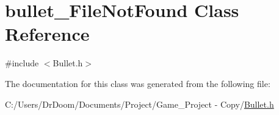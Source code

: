 \hypertarget{classbullet___file_not_found}{}\section{bullet\+\_\+\+File\+Not\+Found Class Reference}
\label{classbullet___file_not_found}


{\ttfamily \#include $<$Bullet.\+h$>$}



The documentation for this class was generated from the following file\+:\begin{DoxyCompactItemize}
\item 
C\+:/\+Users/\+Dr\+Doom/\+Documents/\+Project/\+Game\+\_\+\+Project -\/ Copy/\hyperlink{_bullet_8h}{Bullet.\+h}\end{DoxyCompactItemize}
